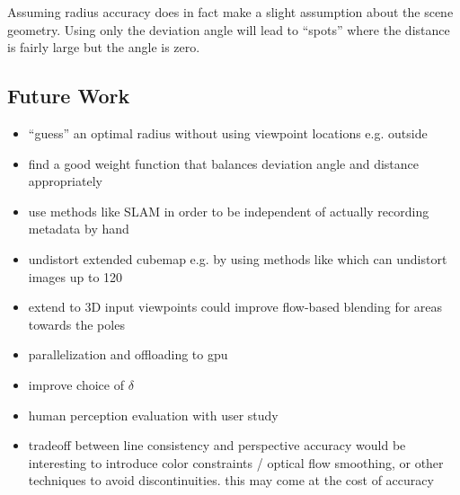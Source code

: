 Assuming radius accuracy does in fact make a slight assumption about the scene geometry. Using only the deviation angle will lead to ``spots'' where the distance is fairly large but the angle is zero. 

\subsection{Future Work}
\begin{itemize}
  \item ``guess'' an optimal radius without using viewpoint locations e.g. outside
  \item find a good weight function that balances deviation angle and distance appropriately
  \item use methods like SLAM in order to be independent of actually recording metadata by hand
  \item undistort extended cubemap e.g. by using methods like \cite{fov} which can undistort images up to 120\degree
  \item extend to 3D \ar input viewpoints could improve flow-based blending for areas towards the poles
  \item parallelization and offloading to gpu
  \item improve choice of $\delta$
  \item human perception evaluation with user study
  \item tradeoff between line consistency and perspective accuracy \ar would be interesting to introduce color constraints / optical flow smoothing, or other techniques to avoid discontinuities. this may come at the cost of accuracy
\end{itemize}

